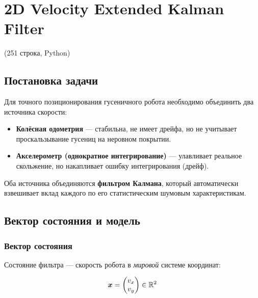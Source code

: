 \chapter{2D Velocity Extended Kalman Filter}
\label{ch:velocity_ekf}

\begin{filebox}[title={Файл исходного кода}]
 \quad (251 строка, Python)
\end{filebox}

\section{Постановка задачи}

Для точного позиционирования гусеничного робота необходимо объединить два
источника скорости:

\begin{itemize}
  \item \textbf{Колёсная одометрия} --- стабильна, не имеет дрейфа, но не учитывает
    проскальзывание гусениц на неровном покрытии.
  \item \textbf{Акселерометр (однократное интегрирование)} --- улавливает реальное
    скольжение, но накапливает ошибку интегрирования (дрейф).
\end{itemize}

Оба источника объединяются \textbf{фильтром Калмана}, который автоматически
взвешивает вклад каждого по его статистическим шумовым характеристикам.

\section{Вектор состояния и модель}

\subsection{Вектор состояния}

Состояние фильтра --- скорость робота в \emph{мировой} системе координат:

\begin{equation}
  \bm{x} = \begin{pmatrix} v_x \\ v_y \end{pmatrix} \in \mathbb{R}^2
  \label{eq:ekf_state}
\end{equation}

